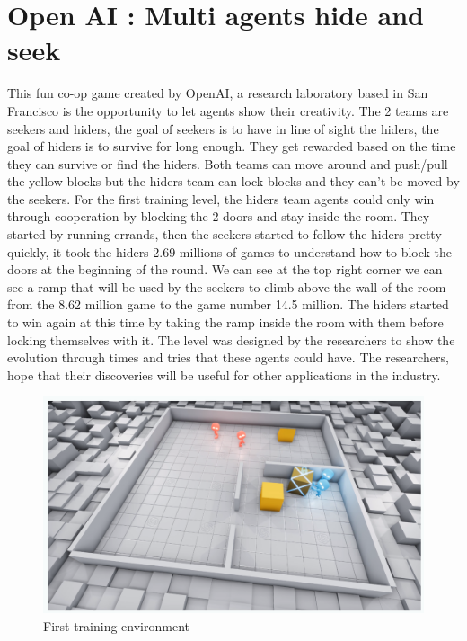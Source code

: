 \documentclass[a4paper,12pt,calibri,oneside,openany]{book}
\theoremstyle{break}
\begin{document}
\section{Open AI : Multi agents hide and seek}
\qquad This fun co-op game created by OpenAI, a research laboratory based in San Francisco is the opportunity to let agents show their creativity. The 2 teams are seekers and hiders, the goal of seekers is to have in line of sight the hiders, the goal of hiders is to survive for long enough. They get rewarded based on the time they can survive or find the hiders. Both teams can move around and push/pull the yellow blocks but the hiders team can lock blocks and they can't be moved by the seekers. For the first training level, the hiders team agents could only win through cooperation by blocking the 2 doors and stay inside the room. They started by running errands, then the seekers started to follow the hiders pretty quickly, it took the hiders 2.69 millions of games to understand how to block the doors at the beginning of the round. We can see at the top right corner we can see a ramp that will be used by the seekers to climb above the wall of the room from the 8.62 million game to the game number 14.5 million. The hiders started to win again at this time by taking the ramp inside the room with them before locking themselves with it. The level was designed by the researchers to show the evolution through times and tries that these agents could have. The researchers, hope that their discoveries will be useful for other applications in the industry. 


\begin{figure}[H]
	\centering\includegraphics[width=\linewidth]{OpenAI1.png}
	\caption{First training environment}
\end{figure}
\end{document}
